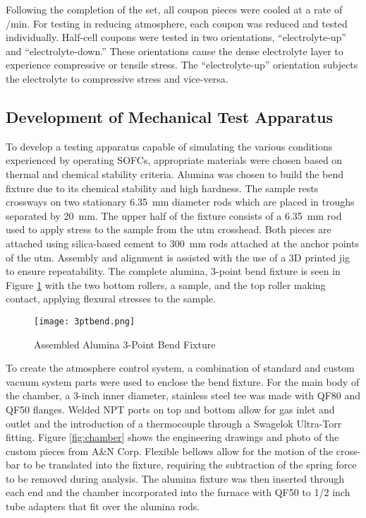     Following the completion of the set, all coupon pieces were cooled at a rate of /min.
    For testing in reducing atmosphere, each coupon was reduced and tested individually.
    Half-cell coupons were tested in two orientations, ``electrolyte-up'' and ``electrolyte-down.''
    These orientations cause the dense electrolyte layer to experience compressive or tensile stress.
    The ``electrolyte-up'' orientation subjects the electrolyte to compressive stress and vice-versa.

    \subsection{Development of Mechanical Test Apparatus}
        To develop a testing apparatus capable of simulating the various conditions experienced by operating SOFCs, appropriate materials were chosen based on thermal and chemical stability criteria.
        Alumina was chosen to build the bend fixture due to its chemical stability and high hardness.
        The sample rests crossways on two stationary \SI{6.35}{\milli\meter} diameter rods which are placed in troughs separated by \SI{20}{\milli\meter}.
        The upper half of the fixture consists of a \SI{6.35}{\milli\meter} rod used to apply stress to the sample from the \gls{utm} crosshead.
        Both pieces are attached using silica-based cement to \SI{300}{\milli\meter} rods attached at the anchor points of the \gls{utm}.
        Assembly and alignment is assisted with the use of a 3D printed jig to ensure repeatability.
        The complete alumina, 3-point bend fixture is seen in Figure \ref{fig:3ptbend} with the two bottom rollers, a sample, and the top roller making contact, applying flexural stresses to the sample.

        \begin{figure}[p]
            \texttt{[image: 3ptbend.png]}
            \caption{Assembled Alumina 3-Point Bend Fixture}
            \label{fig:3ptbend}
        \end{figure}

        To create the atmosphere control system, a combination of standard and custom vacuum system parts were used to enclose the bend fixture.
        For the main body of the chamber, a 3-inch inner diameter, stainless steel tee was made with QF80 and QF50 flanges.
        Welded NPT ports on top and bottom allow for gas inlet and outlet and the introduction of a thermocouple through a Swagelok Ultra-Torr fitting.
        Figure \ref{fig:chamber} shows the engineering drawings and photo of the custom pieces from A\&N Corp.
        Flexible bellows allow for the motion of the cross-bar to be translated into the fixture, requiring the subtraction of the spring force to be removed during analysis.
        The alumina fixture was then inserted through each end and the chamber incorporated into the furnace with QF50 to 1/2 inch tube adapters that fit over the alumina rods.


